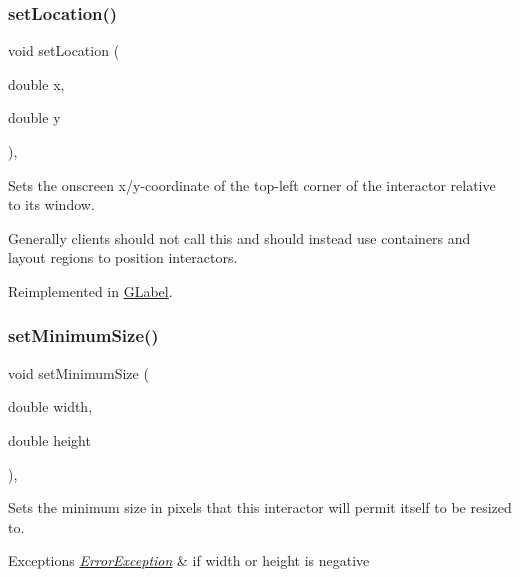 \subsubsection{\texorpdfstring{set\+Location()}{setLocation()}}
{\footnotesize\ttfamily void set\+Location (\begin{DoxyParamCaption}\item[{double}]{x,  }\item[{double}]{y }\end{DoxyParamCaption})\hspace{0.3cm}{\ttfamily [virtual]}, {\ttfamily [inherited]}}



Sets the onscreen x/y-\/coordinate of the top-\/left corner of the interactor relative to its window. 

Generally clients should not call this and should instead use containers and layout regions to position interactors. 

Reimplemented in \mbox{\hyperlink{classGLabel_a40e39a7bf1b0b46b3a5710bb9a0d214b}{G\+Label}}.

\mbox{\label{classGInteractor_a0cf428e207b7f22cc08138a90b1b87b2}} 
\subsubsection{\texorpdfstring{set\+Minimum\+Size()}{setMinimumSize()}\hspace{0.1cm}{\footnotesize\ttfamily [1/2]}}
{\footnotesize\ttfamily void set\+Minimum\+Size (\begin{DoxyParamCaption}\item[{double}]{width,  }\item[{double}]{height }\end{DoxyParamCaption})\hspace{0.3cm}{\ttfamily [virtual]}, {\ttfamily [inherited]}}



Sets the minimum size in pixels that this interactor will permit itself to be resized to. 


\begin{DoxyExceptions}{Exceptions}
{\em \mbox{\hyperlink{classErrorException}{Error\+Exception}}} & if width or height is negative \\
\hline
\end{DoxyExceptions}
\mbox{\label{classGInteractor_a3b1046117ac6cb7abe467e00ba8a81f4}} 
